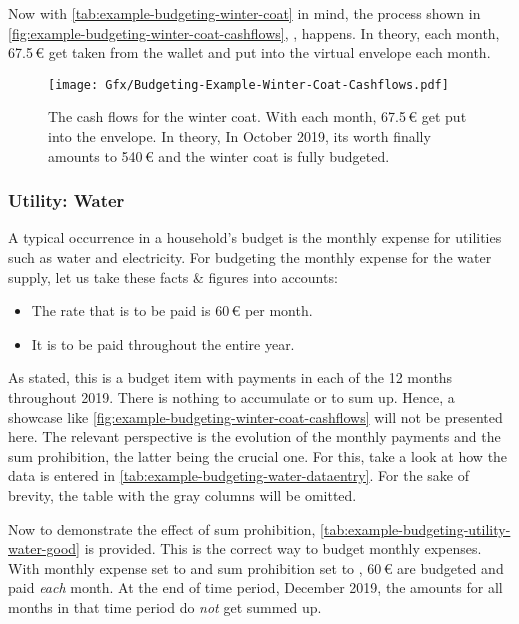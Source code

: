 Now with \autoref{tab:example-budgeting-winter-coat} in mind, the process shown in \autoref{fig:example-budgeting-winter-coat-cashflows}, , happens.
In theory, each month, 67.5\,€ get taken from the wallet and put into the virtual envelope each month.

\begin{figure}[hbtp]
	\centering
	\texttt{[image: Gfx/Budgeting-Example-Winter-Coat-Cashflows.pdf]}
	\caption[The Cash Flows for the Winter Coat]{The cash flows for the winter coat.
	With each month, 67.5\,€ get put into the envelope.
	In theory, 
	In October 2019, its worth finally amounts to 540\,€ and the winter coat is fully budgeted.}
\label{fig:example-budgeting-winter-coat-cashflows}
\end{figure}

\subsubsection{Utility: Water}
\label{subsubsec:example-budgeting-utility-water}

A typical occurrence in a household's budget is the monthly expense for utilities such as water and electricity.
For budgeting the monthly expense for the water supply, let us take these facts \& figures into accounts:
\begin{itemize}
	\item The rate that is to be paid is 60\,€ per month.
	\item It is to be paid throughout the entire year.
\end{itemize}

As stated, this is a budget item with payments in each of the 12 months throughout 2019.
There is nothing to accumulate or to sum up.
Hence, a showcase like \autoref{fig:example-budgeting-winter-coat-cashflows} will not be presented here.
The relevant perspective is the evolution of the monthly payments and the sum prohibition, the latter being the crucial one.
For this, take a look at how the data is entered in \autoref{tab:example-budgeting-water-dataentry}.
For the sake of brevity, the table with the gray columns will be omitted.

Now to demonstrate the effect of sum prohibition, \autoref{tab:example-budgeting-utility-water-good} is provided.
This is the correct way to budget monthly expenses.
With monthly expense set to  and sum prohibition set to , 60\,€ are budgeted and paid \emph{each} month.
At the end of time period, \ie December 2019, the amounts for all months in that time period do \emph{not} get summed up.

